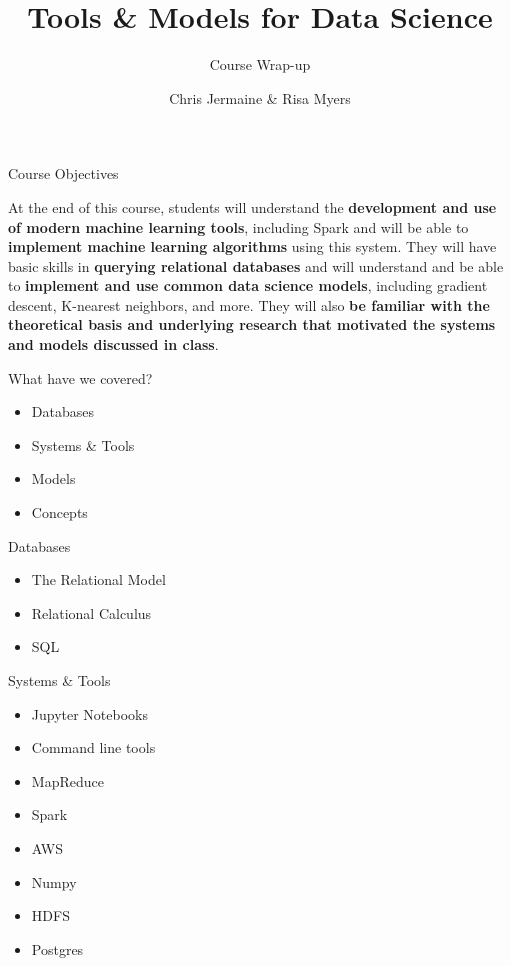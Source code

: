 \documentclass[aspectratio=169]{beamer}
\title[]
{Tools \& Models for Data Science}
\subtitle{Course Wrap-up}
\author[]{Chris Jermaine \& Risa Myers}
\institute
{
  Rice University 
}
\date[]{}
\begin{document}
\begin{frame}
 \titlepage
\end{frame}
\begin{frame}{Course Objectives}

At the end of this course, students will understand the \textbf{development and use of modern machine learning tools}, including Spark and will be able to \textbf{implement machine learning algorithms} using this system. They will have basic skills in \textbf{querying relational databases} and will understand and be able to \textbf{implement and use common data science models}, including gradient descent, K-nearest neighbors, and more. They will also \textbf{be familiar with the theoretical basis and underlying research that motivated the systems and models discussed in class}.

\end{frame}
\begin{frame}{What have we covered?}

\begin{itemize}
\item Databases
\item Systems \& Tools
\item Models
\item Concepts
\end{itemize}
\end{frame}
\begin{frame}{Databases}

\begin{itemize}
\item The Relational Model
\item Relational Calculus
\item SQL
\end{itemize}
\end{frame}
\begin{frame}{Systems \& Tools}

\begin{itemize}
\item Jupyter Notebooks
\item Command line tools
\item MapReduce
\item Spark
\item AWS
\item Numpy
\item HDFS
\item Postgres
\end{itemize}
\end{frame}
\end{document}
